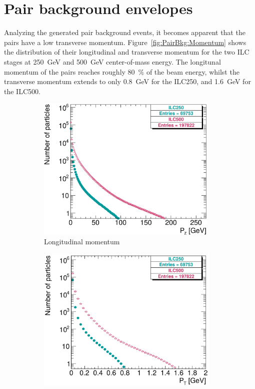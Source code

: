 \section{Pair background envelopes}
\label{PairBkg:helix}
Analyzing the generated pair background events, it becomes apparent that the \positron\electron pairs have a low transverse momentum.
Figure~\ref{fig:PairBkg:Momentum} shows the distribution of their longitudinal and transverse momentum for the two ILC stages at \SI{250}{\GeV} and \SI{500}{\GeV} center-of-mass energy.
The longitunal momentum of the \positron\electron pairs reaches roughly \SI{80}{\percent} of the beam energy, whilst the transverse momentum extends to only \SI{0.8}{\GeV} for the ILC250, and \SI{1.6}{\GeV} for the ILC500.
 \begin{figure}[h]
 \centering
  \begin{subfigure}[b]{0.49\textwidth}
   \centering
    \includegraphics[width=0.95\textwidth]{Figures/Pairs/250_500_pairs_comparison_Pz.png}
   \caption{Longitudinal momentum}
   \end{subfigure}
   \hfill
    \begin{subfigure}[b]{0.49\textwidth}
   \centering
    \includegraphics[width=0.96\textwidth]{Figures/Pairs/250_500_pairs_comparison_PT.png}

\end{subfigure}
\end{figure}
